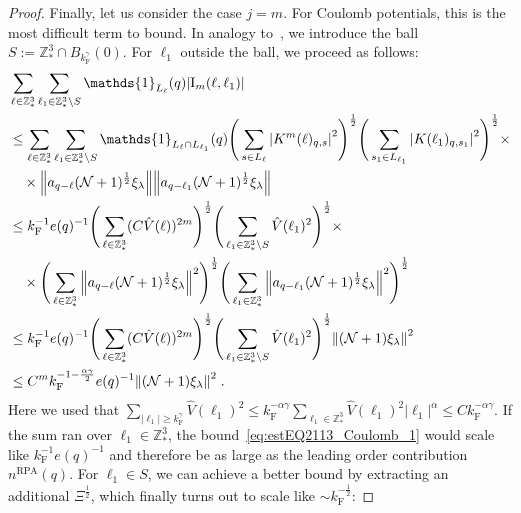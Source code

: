 \documentclass[12pt,a4paper]{article}
\numberwithin{equation}{section}
\newcommand{\1}{\mathbb{I}}
\newcommand{\F}{\mathrm{F}}
\newcommand{\I}{\mathrm{I}}
\newcommand{\RPA}{\mathrm{RPA}}
\newcommand{\Z}{\mathbb{Z}}
\newcommand{\NN}{\mathcal{N}}
\newcommand{\half}{\frac{1}{2}}
\theoremstyle{plain}
\theoremstyle{definition}
\theoremstyle{remark}
\theoremstyle{plain}
\theoremstyle{definition}
\theoremstyle{remark}
\begin{document}
\begin{proof}
Finally, let us consider the case $ j = m $. For Coulomb potentials, this is the most difficult term to bound. In analogy to~\cite{CHN24}, we introduce the ball $ S := \Z^3_* \cap B_{k_{\F}^{\gamma}}(0) $. For $ \ell_1 $ outside the ball, we proceed as follows:
\begin{align}
	&\sum_{\ell \in \Z^3_*} \sum_{\ell_1 \in \Z^3_* \setminus S} \mathds{1}_{L_\ell}(q) |\I_m(\ell, \ell_1)| \nonumber\\
	&\leq \sum_{\ell \in \Z^3_*} \sum_{\ell_1 \in \Z^3_* \setminus S} \mathds{1}_{L_\ell \cap L_{\ell_1}}(q) \Bigg(\sum\limits_{s \in L_{\ell}} \abs{K^m(\ell)_{q,s}}^2\Bigg)^\half
		\Bigg(\sum\limits_{s_1 \in L_{\ell_1}} \abs{K(\ell_1)_{q,s_1}}^2\Bigg)^\half \times \nonumber \\
	& \quad \times \norm{ a_{q-\ell} (\NN+1)^{\half} \xi_\lambda}
		\norm{ a_{q-\ell_1} (\NN+1)^{\half} \xi_\lambda }\nonumber\\
	&\leq k_{\F}^{-1} e(q)^{-1}
		\Bigg( \sum_{\ell \in \Z^3_*} (C \hat{V}(\ell))^{2m} \Bigg)^{\half}
		\Bigg( \sum_{\ell_1 \in \Z^3_* \setminus S} \hat{V}(\ell_1)^2 \Bigg)^{\half} \times \nonumber \\
	& \quad \times 
		\Bigg( \sum_{\ell \in \Z^3_*} \norm{ a_{q-\ell} (\NN+1)^{\half} \xi_\lambda}^2 \Bigg)^{\half}
		\Bigg( \sum_{\ell_1 \in \Z^3_*} \norm{ a_{q-\ell_1} (\NN+1)^{\half} \xi_\lambda }^2 \Bigg)^{\half} \nonumber\\
	&\leq k_{\F}^{-1} e(q)^{-1}
		\Bigg( \sum_{\ell \in \Z^3_*} (C \hat{V}(\ell))^{2m} \Bigg)^{\half}
		\Bigg( \sum_{\ell_1 \in \Z^3_* \setminus S} \hat{V}(\ell_1)^2 \Bigg)^{\half} \norm{(\NN+1) \xi_\lambda}^2 \nonumber\\
	&\leq C^m k_{\F}^{-1-\frac{\alpha \gamma}{2}} e(q)^{-1}
		\norm{(\NN+1) \xi_\lambda}^2 \;. \label{eq:estEQ2113_Coulomb_1}
\end{align}
Here we used that $ \sum_{|\ell_1| \ge k_{\F}^\gamma} \hat{V}(\ell_1)^2 \le k_{\F}^{-\alpha \gamma} \sum_{\ell_1 \in \Z^3_*} \hat{V}(\ell_1)^2 |\ell_1|^\alpha \le C k_{\F}^{-\alpha \gamma} $.
If the sum ran over $ \ell_1 \in \Z^3_* $, the bound~\eqref{eq:estEQ2113_Coulomb_1} would scale like $ k_{\F}^{-1} e(q)^{-1} $ and therefore be as large as the leading order contribution $ n^{\RPA}(q) $. For $ \ell_1 \in S $, we can achieve a better bound by extracting an additional $ \Xi^{\half} $, which finally turns out to scale like $ \sim k_{\F}^{-\half} $:

\end{proof}
\end{document}
